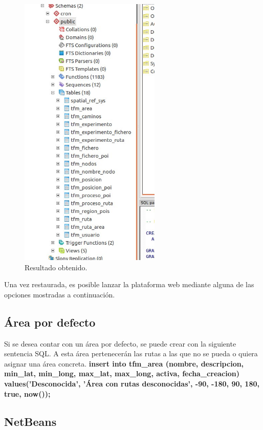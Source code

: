 \begin{figure}[h]
  \centering
    \includegraphics[width=0.6\textwidth]{../img/restoredb/seis.jpg}
  \caption{Resultado obtenido.}
  \label{seis}
\end{figure}


Una vez restaurada, es posible lanzar la plataforma web mediante alguna de las opciones mostradas a continuación.

\subsection{Área por defecto}
Si se desea contar con un área por defecto, se puede crear con la siguiente sentencia SQL. A esta área pertenecerán las rutas a las que no se pueda o quiera asignar una área concreta.
\textbf{
	insert into tfm\_area (nombre, descripcion, min\_lat, min\_long, max\_lat, max\_long, activa, fecha\_creacion) values('Desconocida', 'Área con rutas desconocidas', -90, -180, 90, 180, true, now());
}

\subsection{NetBeans}

